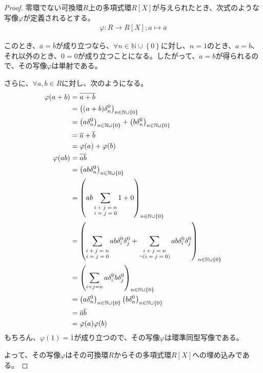 \documentclass[dvipdfmx]{jsarticle}
\begin{document}
\begin{proof}
零環でない可換環$R$上の多項式環$R[ X]$が与えられたとき、次式のような写像$\varphi$が定義されるとする。
\begin{align*}
\varphi:R \rightarrow R[ X];a \mapsto \overline{a}
\end{align*}\par
このとき、$\overline{a} = \overline{b}$が成り立つなら、$\forall n \in \mathbb{N} \cup \left\{ 0 \right\}$に対し、$n = 1$のとき、$a = b$、それ以外のとき、$0 = 0$が成り立つことになる。したがって、$a = b$が得られるので、その写像$\varphi$は単射である。\par
さらに、$\forall a,b \in R$に対し、次のようになる。
\begin{align*}
\varphi(a + b) &= \overline{a + b}\\
&= \left( (a + b) \delta_{n}^{0} \right)_{n \in \mathbb{N} \cup \left\{ 0 \right\}}\\
&= \left( a\delta_{n}^{0} \right)_{n \in \mathbb{N} \cup \left\{ 0 \right\}} + \left( b\delta_{n}^{0} \right)_{n \in \mathbb{N} \cup \left\{ 0 \right\}}\\
&= \overline{a} + \overline{b}\\
&= \varphi(a) + \varphi(b)\\
\varphi(ab) &= \overline{ab}\\
&= \left( ab \delta_{n}^{0} \right)_{n \in \mathbb{N} \cup \left\{ 0 \right\}}\\
&= \left( ab \sum_{\scriptsize \begin{matrix} i + j = n \\i = j = 0 \end{matrix}} 1 + 0 \right)_{n \in \mathbb{N} \cup \left\{ 0 \right\}}\\
&= \left( \sum_{\scriptsize \begin{matrix} i + j = n \\i = j = 0 \end{matrix}} {ab\delta_{i}^{0} \delta_{j}^{0}} + \sum_{\scriptsize \begin{matrix} i + j = n \\\neg(i = j = 0) \end{matrix}} {ab\delta_{i}^{0} \delta_{j}^{0}} \right)_{n \in \mathbb{N} \cup \left\{ 0 \right\}}\\
&= \left( \sum_{i + j = n } {a\delta_{i}^{0} b\delta_{j}^{0}} \right)_{n \in \mathbb{N} \cup \left\{ 0 \right\}}\\
&= \left( a\delta_{n}^{0} \right)_{n \in \mathbb{N} \cup \left\{ 0 \right\}}\left( b\delta_{n}^{0}\right)_{n \in \mathbb{N} \cup \left\{ 0 \right\}}\\
&= \overline{a}\overline{b}\\
&= \varphi(a)\varphi(b)
\end{align*}
もちろん、$\varphi(1) = \overline{1}$が成り立つので、その写像$\varphi$は環準同型写像である。\par
よって、その写像$\varphi$はその可換環$R$からその多項式環$R[ X]$への埋め込みである。
\end{proof}
\end{document}
